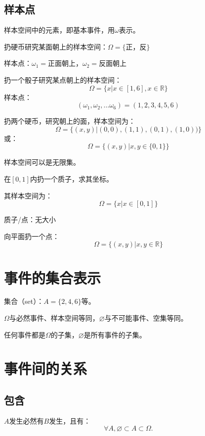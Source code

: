 \subsection{样本点}%
\label{sub:样本点}
样本空间中的元素，即基本事件，用$\omega$表示。
\begin{eg}
	扔硬币研究某面朝上的样本空间：$\Omega=\{\mbox{正，反}\}$

	样本点：$\omega_1=\mbox{正面朝上}$，$\omega_2=\mbox{反面朝上}$
\end{eg}
\begin{eg}
	扔一个骰子研究某点朝上的样本空间：
	$$
	\Omega=\{x|x\in[1,6],x\in\mathbb{R}\}
	$$
	样本点：
	$$
	(\omega_1,\omega_2,\dots\omega_6) = (1,2,3,4,5,6)
	$$
\end{eg}
\begin{eg}
	扔两个硬币，研究朝上的面，样本空间为：
	$$
		\Omega=\{(x,y)|(0,0),(1,1),(0,1),(1,0))\}
	$$
	或：
	$$
		\Omega=\{(x,y)|x,y\in\{0,1\}\}
	$$
\end{eg}
\begin{notation}
	样本空间可以是无限集。
\end{notation}
\begin{eg}
	在$[0,1]$内扔一个质子，求其坐标。

	其样本空间为：
	$$
    \Omega=\{x|x\in[0,1]\}
	$$
\end{eg}
\begin{notation}
    质子/点：无大小
\end{notation}
\begin{eg}
	向平面扔一个点：
	$$
		\Omega=\{(x,y)|x,y\in\mathbb{R}\}
	$$
\end{eg}
\section{事件的集合表示}%
\label{sec:事件的集合表示}
集合（set）：$A=\{2,4,6\}$等。
\begin{notation}
	$\Omega$与必然事件、样本空间等同，$\varnothing$与不可能事件、空集等同。

	任何事件都是$\Omega$的子集，$\varnothing$是所有事件的子集。
\end{notation}

\section{事件间的关系}
\subsection{包含}%
\label{sub:包含}
\begin{center}
\end{center}
$A$发生必然有$B$发生，且有：
\[
\forall A,\varnothing\subset A\subset \Omega
.\] 
